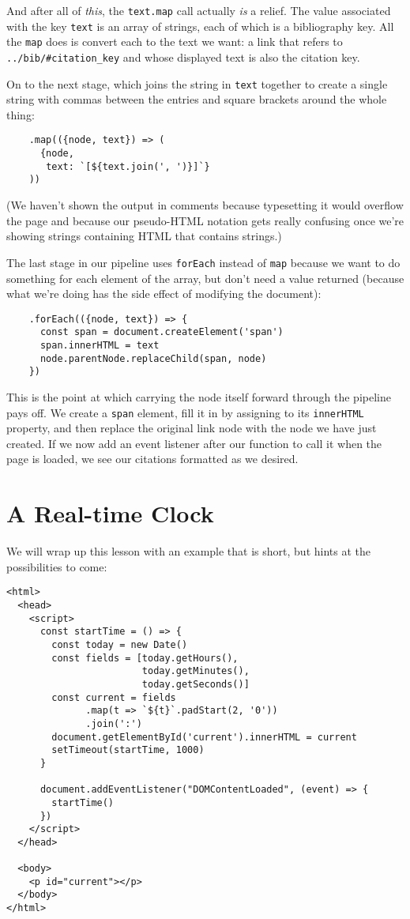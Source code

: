 And after all of \emph{this},
the \texttt{text.map} call actually \emph{is} a relief.
The value associated with the key \texttt{text} is an array of strings,
each of which is a bibliography key.
All the \texttt{map} does is convert each to the text we want:
a link that refers to \texttt{../bib/\#citation\_key} and whose displayed text is also the citation key.

On to the next stage,
which joins the string in \texttt{text} together to create a single string
with commas between the entries
and square brackets around the whole thing:

\begin{verbatim}
    .map(({node, text}) => (
      {node,
       text: `[${text.join(', ')}]`}
    ))
\end{verbatim}

\noindent
(We haven't shown the output in comments because typesetting it would overflow the page
and because our pseudo-HTML notation gets really confusing
once we're showing strings containing HTML that contains strings.)

The last stage in our pipeline uses \texttt{forEach} instead of \texttt{map}
because we want to do something for each element of the array,
but don't need a value returned
(because what we're doing has the side effect of modifying the document):

\begin{verbatim}
    .forEach(({node, text}) => {
      const span = document.createElement('span')
      span.innerHTML = text
      node.parentNode.replaceChild(span, node)
    })
\end{verbatim}

This is the point at which carrying the node itself forward through the pipeline pays off.
We create a \texttt{span} element,
fill it in by assigning to its \texttt{innerHTML} property,
and then replace the original link node with the node we have just created.
If we now add an event listener after our function to call it when the page is loaded,
we see our citations formatted as we desired.

\section{A Real-time Clock}\label{s:pages-clock}

We will wrap up this lesson with an example that is short,
but hints at the possibilities to come:

\begin{verbatim}
<html>
  <head>
    <script>
      const startTime = () => {
        const today = new Date()
        const fields = [today.getHours(),
                        today.getMinutes(),
                        today.getSeconds()]
        const current = fields
              .map(t => `${t}`.padStart(2, '0'))
              .join(':')
        document.getElementById('current').innerHTML = current
        setTimeout(startTime, 1000)
      }

      document.addEventListener("DOMContentLoaded", (event) => {
        startTime()
      })
    </script>
  </head>

  <body>
    <p id="current"></p>
  </body>
</html>
\end{verbatim}

